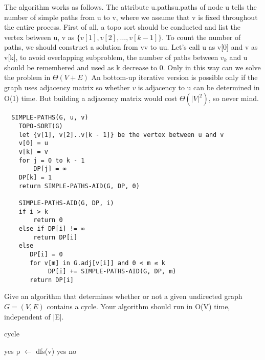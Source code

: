\documentclass[a4paper, justified]{tufte-handout}
\begin{document}
\begin{problem}[TC 22.4-2]
\end{problem}

\begin{solution}
  The algorithm works as follows. The attribute u.pathsu.paths of node u tells the number of simple paths from u to v, where we assume that v is fixed throughout the entire process. First of all, a topo sort should be conducted and list the vertex between u, v as $\{v[1], v[2], \dots, v[k - 1]\}$. To count the number of paths, we should construct a solution from vv to uu. Let's call u as v[0] and v as v[k], to avoid overlapping subproblem, the number of paths between $v_k$ and u should be remembered and used as k decrease to 0. Only in this way can we solve the problem in $\Theta(V + E)$
  An bottom-up iterative version is possible only if the graph uses adjacency matrix so whether $v$ is adjacency to u can be determined in O(1) time. But building a adjacency matrix would cost $\Theta(|V|^2)$, so never mind.
  \begin{verbatim}
  SIMPLE-PATHS(G, u, v)
    TOPO-SORT(G)
    let {v[1], v[2]..v[k - 1]} be the vertex between u and v
    v[0] = u
    v[k] = v
    for j = 0 to k - 1
        DP[j] = ∞
    DP[k] = 1
    return SIMPLE-PATHS-AID(G, DP, 0)

    SIMPLE-PATHS-AID(G, DP, i)
    if i > k
        return 0
    else if DP[i] != ∞
        return DP[i]
    else
       DP[i] = 0
       for v[m] in G.adj[v[i]] and 0 < m ≤ k
            DP[i] += SIMPLE-PATHS-AID(G, DP, m)
       return DP[i]
      \end{verbatim}
\end{solution}

\begin{problem}[TC 22.4-3]
Give an algorithm that determines whether or not a given undirected graph $G=(V,E)$ contains a cycle. Your algorithm should run in O(V) time, independent of |E|.
\end{problem}

\begin{solution}
  \begin{algorithm}
    \caption{cycle}\label{euclid}
    \begin{algorithmic}[1]
      \State \Return yes
      \EndIf
      \State p $\gets$ dfs(v)
      \State \Return yes
      \EndIf
      \EndIf
      \EndFor
      \State \Return no
      \EndProcedure
    \end{algorithmic}
  \end{algorithm}
\end{solution}
\end{document}
